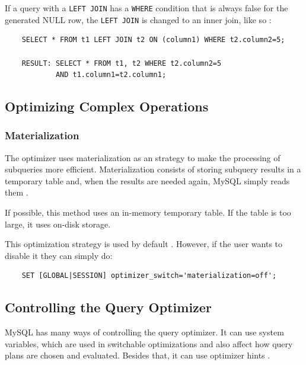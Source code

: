 \documentclass[12pt]{article}
\begin{document}
If a query with a \verb|LEFT JOIN| has a \verb|WHERE| condition that is always false for the generated NULL row, the \verb|LEFT JOIN| is changed to an inner join, like so \parencite{OuterJoinOptimization}:
\begin{verbatim}
    SELECT * FROM t1 LEFT JOIN t2 ON (column1) WHERE t2.column2=5;

    RESULT: SELECT * FROM t1, t2 WHERE t2.column2=5 
            AND t1.column1=t2.column1;
\end{verbatim}


\subsection{Optimizing Complex Operations}
\label{complexOperations}

\subsubsection{Materialization}
\label{materialization}

The optimizer uses materialization as an strategy to make the processing of subqueries more efficient. Materialization consists of storing subquery results in a temporary table and, when the results are needed again, MySQL simply reads them \parencite{Materialization}.

If possible, this method uses an in-memory temporary table. If the table is too large, it uses on-disk storage.

This optimization strategy is used by default \parencite{SwitchableOptimizations}. However, if the user wants to disable it they can simply do:

\begin{verbatim}
    SET [GLOBAL|SESSION] optimizer_switch='materialization=off';
\end{verbatim}


\subsection{Controlling the Query Optimizer}
\label{controllingQueryOptimizer}
MySQL has many ways of controlling the query optimizer. It can use system variables, which are used in switchable optimizations and also affect how query plans are chosen and evaluated. Besides that, it can use optimizer hints \parencite{ControllingOptimizer}.
\end{document}
